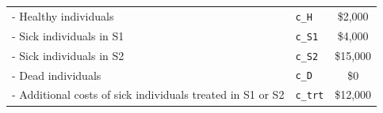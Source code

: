 \documentclass[
]{article}
\begin{document}
\begin{longtable}[]{@{}llc@{}}
\begin{minipage}[t]{0.51\columnwidth}\raggedright
- Healthy individuals\strut
\end{minipage} & \begin{minipage}[t]{0.19\columnwidth}\raggedright
\texttt{c\_H}\strut
\end{minipage} & \begin{minipage}[t]{0.21\columnwidth}\centering
\$2,000\strut
\end{minipage}\tabularnewline
\begin{minipage}[t]{0.51\columnwidth}\raggedright
- Sick individuals in S1\strut
\end{minipage} & \begin{minipage}[t]{0.19\columnwidth}\raggedright
\texttt{c\_S1}\strut
\end{minipage} & \begin{minipage}[t]{0.21\columnwidth}\centering
\$4,000\strut
\end{minipage}\tabularnewline
\begin{minipage}[t]{0.51\columnwidth}\raggedright
- Sick individuals in S2\strut
\end{minipage} & \begin{minipage}[t]{0.19\columnwidth}\raggedright
\texttt{c\_S2}\strut
\end{minipage} & \begin{minipage}[t]{0.21\columnwidth}\centering
\$15,000\strut
\end{minipage}\tabularnewline
\begin{minipage}[t]{0.51\columnwidth}\raggedright
- Dead individuals\strut
\end{minipage} & \begin{minipage}[t]{0.19\columnwidth}\raggedright
\texttt{c\_D}\strut
\end{minipage} & \begin{minipage}[t]{0.21\columnwidth}\centering
\$0\strut
\end{minipage}\tabularnewline
\begin{minipage}[t]{0.51\columnwidth}\raggedright
- Additional costs of sick individuals treated in S1 or S2\strut
\end{minipage} & \begin{minipage}[t]{0.19\columnwidth}\raggedright
\texttt{c\_trt}\strut
\end{minipage} & \begin{minipage}[t]{0.21\columnwidth}\centering
\$12,000\strut
\end{minipage}\tabularnewline

\end{longtable}
\end{document}
